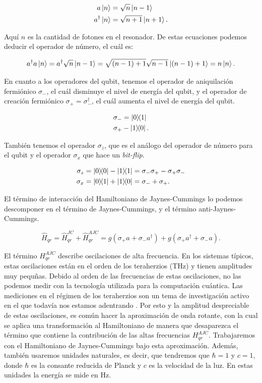 \begin{align}
    a \ket{n} &= \sqrt{n} \ket{n-1} \\
    a^\dagger \ket{n} &= \sqrt{n+1} \ket{n+1} .
\end{align}

Aquí $n$ es la cantidad de fotones en el resonador. De estas ecuaciones podemos deducir el operador de número, el cuál es:

\begin{equation}
    a^\dagger a \ket{n} = a^\dagger \sqrt{n} \ket{n-1} = \sqrt{(n-1)+1} \sqrt{n-1} \ket{(n-1)+1} = n \ket{n} .
\end{equation}

En cuanto a los operadores del qubit, tenemos el operador de aniquilación fermiónico $\sigma_-$, el cuál disminuye el nivel de energía del qubit, y el operador de creación fermiónico $\sigma_+ = \sigma_-^\dagger$, el cuál aumenta el nivel de energía del qubit.

\begin{align}
    \sigma_- &= \ketbra{0}{1} \\
    \sigma_+ &- \ketbra{1}{0} .
\end{align}

También tenemos el operador $\sigma_z$, que es el análogo del operador de número para el qubit y el operador $\sigma_x$ que hace un \textit{bit-flip}.

\begin{align}
    \sigma_z &= \ketbra{0} - \ketbra{1} = \sigma_-\sigma_+ - \sigma_+\sigma_- \\
    \sigma_x &= \ketbra{0}{1} + \ketbra{1}{0} = \sigma_- + \sigma_+ .
\end{align}

El término de interacción del Hamiltoniano de Jaynes-Cummings lo podemos descomponer en el término de Jaynes-Cummings, y el término anti-Jaynes-Cummings.

\begin{equation}
    \hat{H}_{qr} = \hat{H}_{qr}^{JC} + \hat{H}_{qr}^{AJC} = g(\sigma_+ a + \sigma_- a^\dag) + g(\sigma_+ a^\dag + \sigma_- a) .
\end{equation}

El término $H_{qr}^{AJC}$ describe oscilaciones de alta frecuencia. En los sistemas típicos, estas oscilaciones están en el orden de los teraherzios (THz) y tienen amplitudes muy pequñas. Debido al orden de las frecuencias de estas oscilaciones, no las podemos medir con la tecnología utilizada para la computación cuántica. Las mediciones en el régimen de los teraherzios son un tema de investigación activo en el que todavía nos estamos adentrando \cite{schmuttenmaer}. Por esto y la amplitud despreciable de estas oscilaciones, es común hacer la aproximación de onda rotante, con la cual se aplica una transformación al Hamiltoniano de manera que desaparezca el término que contiene la contribución de las altas frecuencias $H_{qr}^{AJC}$. Trabajaremos con el Hamiltoniano de Jaynes-Cummings bajo esta aproximación. Además, también usaremos unidades naturales, es decir, que tendremos que $\hbar = 1$ y $c = 1$, donde $\hbar$ es la consante reducida de Planck y $c$ es la velocidad de la luz. En estas unidades la energía se mide en Hz.

